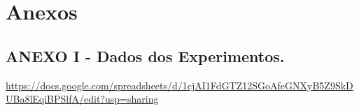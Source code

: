 \chapter{Anexos}
\appendix
\section{ANEXO I - Dados dos Experimentos.}
\url{https://docs.google.com/spreadsheets/d/1cjAI1FdGTZ12SGoAfeGNXyB5Z9SkDUBa8lEqiBPSlfA/edit?usp=sharing}

